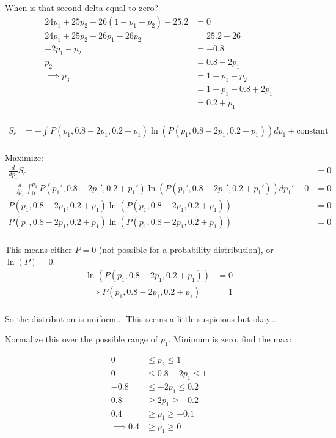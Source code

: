 \begin{enumerate}[label=\textbf{\Alph*}.]
    When is that second delta equal to zero?
    \begin{align*}
        24p_1 + 25p_2 + 26(1 - p_1 - p_2) - 25.2 &= 0\\
        24p_1 + 25p_2 - 26p_1 - 26p_2 &= 25.2 - 26\\
        -2p_1 - p_2 &= -0.8\\
        p_2 &= 0.8 - 2p_1\\
        \implies p_3 &= 1 - p_1 - p_2 \\
        &= 1 - p_1 - 0.8 + 2p_1 \\
        &= 0.2 + p_1 \\
    \end{align*}

    \begin{align*}
        S_c &= -\int P(p_1, 0.8 - 2p_1, 0.2 + p_1) \ln(P(p_1, 0.8 - 2p_1, 0.2 + p_1)) dp_1 + \text{constant} \\
    \end{align*}

    Maximize:
    \begin{align*}
        \frac{d}{dp_1}S_c &= 0 \\
        -\frac{d}{dp_1}\int_0^{p_1} P(p_1', 0.8 - 2p_1', 0.2 + p_1') \ln(P(p_1', 0.8 - 2p_1', 0.2 + p_1')) dp_1' + 0 &= 0 \\
        P(p_1, 0.8 - 2p_1, 0.2 + p_1) \ln(P(p_1, 0.8 - 2p_1, 0.2 + p_1)) &= 0 \\
        P(p_1, 0.8 - 2p_1, 0.2 + p_1) \ln(P(p_1, 0.8 - 2p_1, 0.2 + p_1)) &= 0 \\
    \end{align*}

    This means either $P = 0$ (not possible for a probability distribution), or $\ln(P) = 0$.
    \begin{align*}
        \ln(P(p_1, 0.8 - 2p_1, 0.2 + p_1)) &= 0 \\
        \implies P(p_1, 0.8 - 2p_1, 0.2 + p_1) &= 1 \\
    \end{align*}

    So the distribution is uniform... This seems a little suspicious but okay...

    Normalize this over the possible range of $p_1$. Minimum is zero, find the max:


    \begin{align*}
        0 &\le p_2 \le 1 \\
        0 &\le 0.8 - 2p_1 \le 1 \\
        -0.8 &\le - 2p_1 \le 0.2 \\
        0.8 &\ge 2p_1 \ge -0.2 \\
        0.4 &\ge p_1 \ge -0.1 \\
        \implies 0.4 &\ge p_1 \ge 0 \\
    \end{align*}


\end{enumerate}
